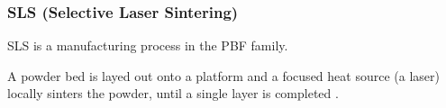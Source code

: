 \documentclass{article}
\begin{document}
%
%
%
%

    \subsubsection{SLS (Selective Laser Sintering) \label{SLS_general}}

    SLS is a manufacturing process in the PBF family. 

    A powder bed is layed out onto a platform and a focused heat source (a laser) locally sinters the powder, 
    until a single layer is completed \autocites*{Recent_progress_polymers_AM}{Kovalcik_PHA_Review}. 
\end{document}
